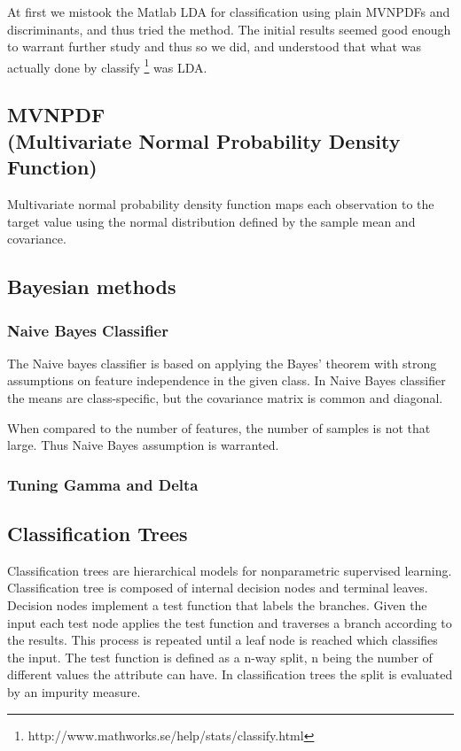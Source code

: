 \documentclass[a4paper,10pt]{article}
\begin{document}
At first we mistook the Matlab LDA for classification using plain MVNPDFs and discriminants, and thus tried the method. The initial results seemed good enough to warrant further study and thus so we did, and understood that what was actually done by classify \footnote{http://www.mathworks.se/help/stats/classify.html} was LDA.

\subsection{MVNPDF\\ {\small (Multivariate Normal Probability Density Function)}}
Multivariate normal probability density function maps each observation to the target value using the normal distribution defined by the sample mean and covariance.

\subsection{Bayesian methods}
\subsubsection{Naive Bayes Classifier}
The Naive bayes classifier is based on applying the Bayes’ theorem with strong assumptions on feature independence in the given class. In Naive Bayes classifier the means are class-specific, but the covariance matrix is common and diagonal.

When compared to the number of features, the number of samples is not that large. Thus Naive Bayes assumption is warranted.

\subsubsection{Tuning Gamma and Delta}

\subsection{Classification Trees}

Classification trees are hierarchical models for nonparametric supervised learning. Classification tree is composed of internal decision nodes and terminal leaves. Decision nodes implement a test function that labels the branches. Given the input each test node applies the test function and traverses a branch according to the results. This process is repeated until a leaf node is reached which classifies the input. The test function is defined as a n-way split, n being the number of different values the attribute can have. In classification trees the split is evaluated by an impurity measure.
\end{document}
